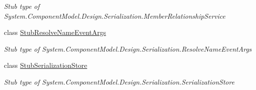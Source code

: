 \begin{DoxyCompactItemize}
\begin{DoxyCompactList}\small\item\em Stub type of System.\-Component\-Model.\-Design.\-Serialization.\-Member\-Relationship\-Service\end{DoxyCompactList}\item 
class \hyperlink{class_system_1_1_component_model_1_1_design_1_1_serialization_1_1_fakes_1_1_stub_resolve_name_event_args}{Stub\-Resolve\-Name\-Event\-Args}
\begin{DoxyCompactList}\small\item\em Stub type of System.\-Component\-Model.\-Design.\-Serialization.\-Resolve\-Name\-Event\-Args\end{DoxyCompactList}\item 
class \hyperlink{class_system_1_1_component_model_1_1_design_1_1_serialization_1_1_fakes_1_1_stub_serialization_store}{Stub\-Serialization\-Store}
\begin{DoxyCompactList}\small\item\em Stub type of System.\-Component\-Model.\-Design.\-Serialization.\-Serialization\-Store\end{DoxyCompactList}\end{DoxyCompactItemize}
